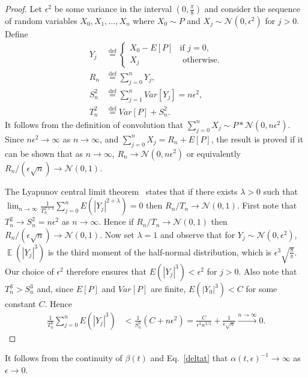 \documentclass[11pt,table]{article}
\DeclareMathOperator*{\E}{\mathbb{E}}
\newcommand{\N}[2]{\mathcal{N}\left(#1 , #2\right)}
\newcommand*{\defeq}{\stackrel{\text{def}}{=}}
\newcommand{\0}[1]{\constvec{0}{#1}}
\newcommand{\1}[1]{\constvec{1}{#1}}
\begin{document}
\begin{proof}
Let $\epsilon^2$ be some variance in the interval $\left(0, \frac{\pi}{8}\right)$ and consider the sequence of random variables $X_0,X_1,\dots,X_n$ where $X_0 \sim P$ and $X_j \sim \N{0}{\epsilon^2}$ for $j > 0$. Define
\begin{align}
Y_j &\defeq \begin{cases}X_0 - E[P]&\text{if } j=0,\\ X_j &\text{ otherwise.}\end{cases}\\
R_n &\defeq \sum_{j=0}^n Y_j,\\
S^2_n &\defeq \sum_{j=1}^n Var[Y_j] = n \epsilon^2,\\
T^2_n &\defeq Var[P] + S^2_n.
\end{align}
It follows from the definition of convolution that $\sum_{j=0}^n X_j \sim P \ast \N{0}{n\epsilon^2}$. 
Since $n \epsilon^2 \rightarrow \infty$ as $n \rightarrow \infty$, and $\sum_{j=0}^n X_j =  R_n + E[P]$, the result is proved if it can be shown that as $n \rightarrow \infty$, $R_n \rightarrow \N{0}{n\epsilon^2}$ or equivalently $R_n/(\epsilon\sqrt{n}) \rightarrow \N{0}{1}$.

\sloppy The Lyapunov central limit theorem~\citep{georgii2008stochastics} states that if there exists $\lambda > 0$ such that $\lim_{n\rightarrow \infty}\frac{1}{T_n^{2+\lambda}}\sum_{j=0}^n E\left(|Y_j|^{2+\lambda}\right) = 0$ then $R_n/T_n \rightarrow \N{0}{1}$.
First note that $T_n^2 \rightarrow S_n^2 = n\epsilon^2$ as $n \rightarrow \infty$.
Hence if $R_n/T_n \rightarrow \N{0}{1}$ then $R_n/(\epsilon\sqrt{n}) \rightarrow \N{0}{1}$.
Now set $\lambda=1$ and observe that for $Y_j \sim \N{0}{\epsilon^2}$, $\E\left(|Y_j|^{3}\right)$ is the third moment of the half-normal distribution, which is $\epsilon^3\sqrt{\frac{8}{\pi}}$.
Our choice of $\epsilon^2$ therefore ensures that $E\left(|Y_j|^{3}\right) < \epsilon^2$ for $j > 0$.
Also note that $T_n^3 > S_n^3$ and, since $E[P]$ and $Var[P]$ are finite, $E\left(|Y_0|^{3}\right) < C$ for some constant $C$.
Hence
\begin{align}
\frac{1}{T_n^3}\sum_{j=0}^n E\left(|Y_j|^{3}\right) &< 
\frac{1}{S_n^{3}}\left(C + n\epsilon^2\right) = \frac{C}{\epsilon^3 n^{3/2}} + \frac{1}{\epsilon\sqrt{n}} \xrightarrow[]{n\rightarrow\infty}0.
\end{align}
\end{proof}
It follows from the continuity of $\beta(t)$ and Eq.~\ref{deltat} that $\alpha(t, \epsilon)^{-1} \rightarrow \infty$ as $\epsilon \rightarrow 0$.
\end{document}
